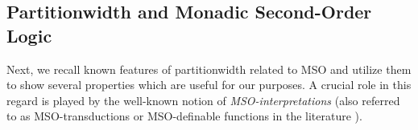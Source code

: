 \documentclass[10pt,a4paper]{amsart}
\theoremstyle{definition}
\numberwithin{equation}{section}
\theoremstyle{plain}
\theoremstyle{definition}
\theoremstyle{myexample}
\theoremstyle{plain}
\theoremstyle{definition}
\newcommand{\instance}{\mathcal{I}}
\newcommand{\inst}{\instance}
\newcommand{\origcol}{o}
\newcommand{\fcadd}{\fcn{CAdd}}
\newcommand{\frecol}{\fcn{ReCol}}
\newcommand{\fcn}[1]{\mathsf{#1}}
\newcommand{\sig}{\Sigma}
\newcommand{\pred}[1]{\mathtt{#1}}
\newcommand{\const}[1]{\mathtt{#1}}
\newcommand{\shortto}{\hstretch{0.5}{\to}}
\begin{document}
%			
%
%





\subsection{Partitionwidth and Monadic Second-Order Logic}


Next, we recall known features of partitionwidth related to MSO and utilize them to show several properties which are useful for our purposes. A crucial role in this regard is played by the well-known notion of \emph{MSO-interpretations} 
(also referred to as MSO-transductions or MSO-definable functions in the literature \cite{ArnborgLS88,Courcelle91a,Engelfriet90,Courcelle94,CourEngBook}). 
\end{document}
